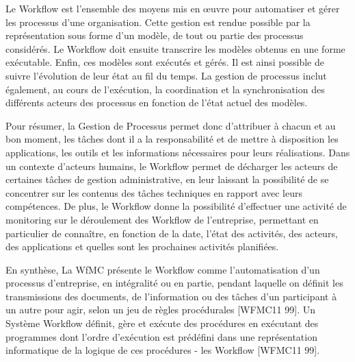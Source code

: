  	 Le Workflow est l’ensemble des moyens mis en œuvre pour automatiser et gérer les processus d’une organisation. Cette gestion est rendue possible par la représentation sous forme d’un modèle, de tout ou partie des processus considérés. Le Workflow doit ensuite transcrire les modèles obtenus en une forme exécutable. Enfin, ces modèles sont exécutés et gérés. Il est ainsi possible de suivre l’évolution de leur état au fil du temps. La gestion de processus inclut également, au cours de l’exécution, la coordination et la synchronisation des différents acteurs des processus en fonction de l’état actuel des modèles.
 	 
 	 Pour résumer, la Gestion de Processus permet donc d’attribuer à chacun et au bon moment, les tâches dont il a la responsabilité et de mettre à disposition les applications, les outils et les informations nécessaires pour leurs réalisations. Dans un contexte d’acteurs humains, le Workflow permet de décharger les acteurs de certaines tâches de gestion administrative, en leur laissant la possibilité de se concentrer sur les contenus des tâches techniques en rapport avec leurs compétences. De plus, le Workflow donne la possibilité d’effectuer une activité de monitoring sur le déroulement des Workflow de l’entreprise, permettant en particulier de connaître, en fonction de la date, l’état des activités, des acteurs, des applications et quelles sont les prochaines activités planifiées. 
 	 
 	 En synthèse, La WfMC présente le Workflow comme l’automatisation d’un processus d’entreprise, en intégralité ou en partie, pendant laquelle on définit les transmissions des documents, de l’information ou des tâches d’un participant à un autre pour agir, selon un jeu de règles procédurales [WFMC11 99]. Un Système Workflow définit, gère et exécute des procédures en exécutant des programmes dont l’ordre d’exécution est prédéfini dans une représentation informatique de la logique de ces procédures - les Workflow [WFMC11 99]. 
 	 
